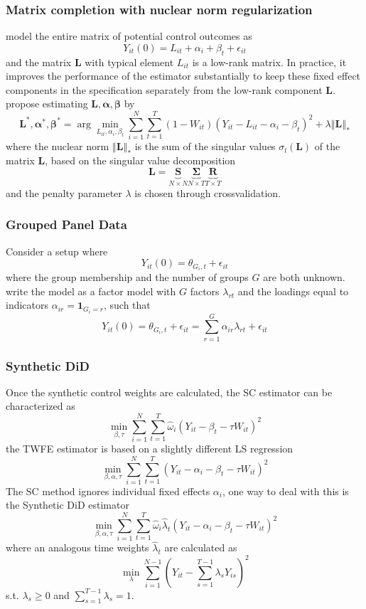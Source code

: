 \documentclass[twoside]{article}
\begin{document}
\subsubsection{Matrix completion with nuclear norm regularization}
\citet{athey2021matrix} model the entire matrix of potential control outcomes as $$ Y_{it}(0) = L_{it} + \alpha_i + \beta_t + \epsilon_{it} $$
and the matrix $\mathbf{L}$ with typical element $L_{it}$ is a low-rank matrix.
In practice, it improves the performance of the estimator substantially to keep these fixed effect components in the specification separately from the low-rank component $\mathbf{L}$. \citet{athey2021matrix} propose estimating $\mathbf{L},\boldsymbol{\alpha,\beta}$ by
$$ \mathbf{L}^*,\boldsymbol{\alpha}^*,\boldsymbol{\beta}^* = \arg\min_{L_{it},\alpha_{i},\beta_{t}} \sum^N_{i=1}\sum^T_{t=1}\left(1-W_{it}\right)\left(Y_{it}-L_{it}-\alpha_i-\beta_t\right)^2 + \lambda \left\Vert \mathbf{L} \right\Vert _* $$
where the nuclear norm $\left\Vert \mathbf{L} \right\Vert _*$ is the sum of the singular values $\sigma_l\left(\mathbf{L}\right)$ of the matrix $\mathbf{L}$, based on the singular value decomposition $$\mathbf{L}=\underbrace{\mathbf{S}}_{N\times N} \underbrace{\boldsymbol{\Sigma}}_{N\times T} \underbrace{\mathbf{R}}_{T\times T}$$
and the penalty parameter $\lambda$ is chosen through crossvalidation.

\subsubsection{Grouped Panel Data}
Consider a setup where
$$ Y_{it}(0) = \theta_{G_i,t} + \epsilon_{it} $$
where the group membership and the number of groups $G$ are both unknown.
\citet{bonhomme2022discretizing} write the model as a factor model with $G$ factors $\lambda_{rt}$ and the loadings equal to indicators $\alpha_{ir}=\mathbf{1}_{G_i=r}$, such that $$ Y_{it}(0) = \theta_{G_i,t}+\epsilon_{it} = \sum^G_{r=1}\alpha_{ir}\lambda_{rt} + \epsilon_{it} $$

\subsubsection{Synthetic DiD}
Once the synthetic control weights are calculated, the SC estimator can be characterized as $$ \min_{\beta,\tau}\sum^N_{i=1}\sum^T_{t=1}\hat{\omega}_i\left( Y_{it} -\beta_t -\tau W_{it}\right)^2 $$
the TWFE estimator is based on a slightly different LS regression $$ \min_{\beta,\alpha,\tau}\sum^N_{i=1}\sum^T_{t=1}\left(Y_{it}-\alpha_i-\beta_t -\tau W_{it}\right)^2 $$
The SC method ignores individual fixed effects $\alpha_i$, one way to deal with this is the Synthetic DiD estimator $$ \min_{\beta,\alpha,\tau}\sum^N_{i=1}\sum^T_{t=1}\hat{\omega}_i\hat{\lambda}_t\left(Y_{it}-\alpha_i-\beta_t -\tau W_{it}\right)^2 $$
where an analogous time weights $\hat{\lambda}_t$ are calculated  as $$ \min_{\lambda} \sum^{N-1}_{i=1}\left(Y_{it}-\sum^{T-1}_{s=1}\lambda_sY_{is}\right)^2 $$ s.t. $\lambda_s\geq 0$ and $\sum^{T-1}_{s=1}\lambda_s=1$.
\end{document}
